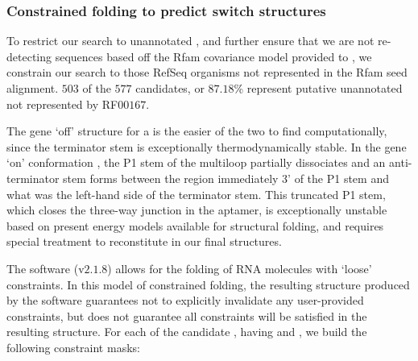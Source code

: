 \subsubsection{Constrained folding to predict switch structures}
\label{subsubsec:rfinder:consfold}

To restrict our search to unannotated \grbs, and further ensure that we are not
re-detecting sequences based off the Rfam covariance model provided to \infernal,
we constrain our search to those RefSeq organisms not represented in the Rfam seed
alignment. $503$ of the $577$ candidates, or $87.18$\% represent putative unannotated
\rbs not represented by RF$00167$.

The gene `off' structure \strOff for a \grb is the easier of the two to find
computationally, since the terminator stem is exceptionally thermodynamically
stable. In the gene `on' conformation \strOn, the P1 stem of the multiloop partially
dissociates and an anti-terminator stem forms between the region immediately 3' of
the P1 stem and what was the left-hand side of the terminator stem. This truncated
P1 stem, which closes the three-way junction in the aptamer, is exceptionally
unstable based on present energy models available for structural folding, and
requires special treatment to reconstitute in our final structures.

The software \rfold (v$2.1.8$) allows for the folding of RNA molecules with `loose'
constraints. In this model of constrained folding, the resulting structure
produced by the software guarantees not to explicitly invalidate any user-provided
constraints, but does not guarantee all constraints will be satisfied in the
resulting structure. For each of the candidate \grbs, having \treeFor{\infernal}
and \treeFor{\tthp}, we build the following constraint masks:

